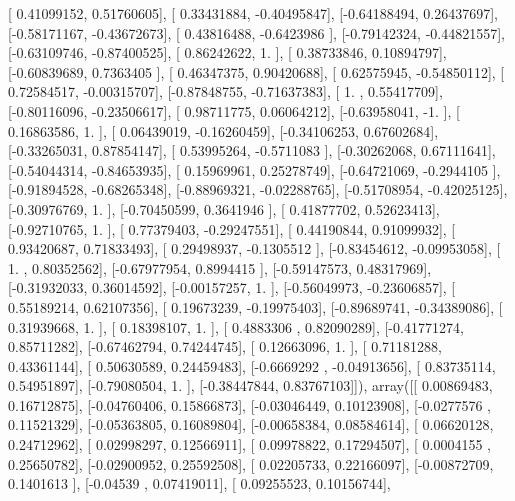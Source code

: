\documentclass{article}
\begin{document}
       [ 0.41099152,  0.51760605],
       [ 0.33431884, -0.40495847],
       [-0.64188494,  0.26437697],
       [-0.58171167, -0.43672673],
       [ 0.43816488, -0.6423986 ],
       [-0.79142324, -0.44821557],
       [-0.63109746, -0.87400525],
       [ 0.86242622,  1.        ],
       [ 0.38733846,  0.10894797],
       [-0.60839689,  0.7363405 ],
       [ 0.46347375,  0.90420688],
       [ 0.62575945, -0.54850112],
       [ 0.72584517, -0.00315707],
       [-0.87848755, -0.71637383],
       [ 1.        ,  0.55417709],
       [-0.80116096, -0.23506617],
       [ 0.98711775,  0.06064212],
       [-0.63958041, -1.        ],
       [ 0.16863586,  1.        ],
       [ 0.06439019, -0.16260459],
       [-0.34106253,  0.67602684],
       [-0.33265031,  0.87854147],
       [ 0.53995264, -0.5711083 ],
       [-0.30262068,  0.67111641],
       [-0.54044314, -0.84653935],
       [ 0.15969961,  0.25278749],
       [-0.64721069, -0.2944105 ],
       [-0.91894528, -0.68265348],
       [-0.88969321, -0.02288765],
       [-0.51708954, -0.42025125],
       [-0.30976769,  1.        ],
       [-0.70450599,  0.3641946 ],
       [ 0.41877702,  0.52623413],
       [-0.92710765,  1.        ],
       [ 0.77379403, -0.29247551],
       [ 0.44190844,  0.91099932],
       [ 0.93420687,  0.71833493],
       [ 0.29498937, -0.1305512 ],
       [-0.83454612, -0.09953058],
       [ 1.        ,  0.80352562],
       [-0.67977954,  0.8994415 ],
       [-0.59147573,  0.48317969],
       [-0.31932033,  0.36014592],
       [-0.00157257,  1.        ],
       [-0.56049973, -0.23606857],
       [ 0.55189214,  0.62107356],
       [ 0.19673239, -0.19975403],
       [-0.89689741, -0.34389086],
       [ 0.31939668,  1.        ],
       [ 0.18398107,  1.        ],
       [ 0.4883306 ,  0.82090289],
       [-0.41771274,  0.85711282],
       [-0.67462794,  0.74244745],
       [ 0.12663096,  1.        ],
       [ 0.71181288,  0.43361144],
       [ 0.50630589,  0.24459483],
       [-0.6669292 , -0.04913656],
       [ 0.83735114,  0.54951897],
       [-0.79080504,  1.        ],
       [-0.38447844,  0.83767103]]), array([[ 0.00869483,  0.16712875],
       [-0.04760406,  0.15866873],
       [-0.03046449,  0.10123908],
       [-0.0277576 ,  0.11521329],
       [-0.05363805,  0.16089804],
       [-0.00658384,  0.08584614],
       [ 0.06620128,  0.24712962],
       [ 0.02998297,  0.12566911],
       [ 0.09978822,  0.17294507],
       [ 0.0004155 ,  0.25650782],
       [-0.02900952,  0.25592508],
       [ 0.02205733,  0.22166097],
       [-0.00872709,  0.1401613 ],
       [-0.04539   ,  0.07419011],
       [ 0.09255523,  0.10156744],
\end{document}
